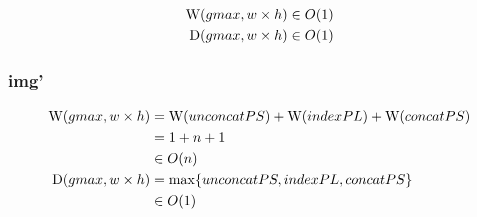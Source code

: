       \begin{equation}
      \begin{split}
      \textrm{W}(gmax,w \times h)
            & \in O(1) \\
      \textrm{D}(gmax, w \times h)
            & \in O(1) \\
      \end{split}
      \end{equation}
      
    \subsubsection*{img'}
      \begin{equation}
      \begin{split}
      \textrm{W}(gmax, w \times h)
            & = \textrm{W}(unconcatPS) + \textrm{W}(indexPL) + \textrm{W}(concatPS) \\
            & = 1 + n + 1 \\
            & \in O(n) \\
      \textrm{D}(gmax, w \times h)
          & = \max \{ unconcatPS, indexPL, concatPS \} \\
          & \in O(1)
      \end{split}
      \end{equation}
    

